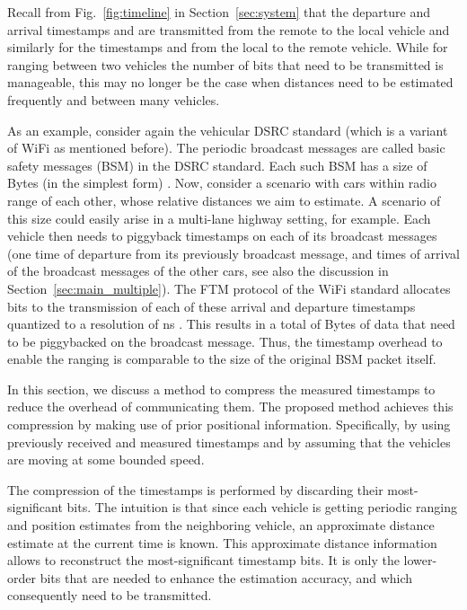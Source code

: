 \documentclass[12pt,journal,final,onecolumn]{IEEEtran}
\theoremstyle{definition}
\theoremstyle{myremark}
\begin{document}
Recall from Fig.~\ref{fig:timeline} in Section~\ref{sec:system} that the
departure and arrival timestamps  and  are transmitted from the
remote to the local vehicle and similarly for the timestamps  and
 from the local to the remote vehicle.  While for ranging between two
vehicles the number of bits that need to be transmitted is manageable, this may
no longer be the case when distances need to be estimated frequently and between
many vehicles. 

As an example, consider again the vehicular DSRC standard (which is a variant of
WiFi as mentioned before). The periodic broadcast messages are called basic
safety messages (BSM) in the DSRC standard. Each such BSM has a size of 
Bytes (in the simplest form) \cite{ansari2013}. Now, consider a scenario with
 cars within radio range of each other, whose relative distances we aim to
estimate. A scenario of this size could easily arise in a multi-lane highway
setting, for example. Each vehicle then needs to piggyback  timestamps on
each of its broadcast messages (one time of departure from its previously
broadcast message, and  times of arrival of the broadcast messages of the
other cars, see also the discussion in Section~\ref{sec:main_multiple}). The FTM
protocol of the WiFi standard allocates  bits to the transmission of each of
these arrival and departure timestamps quantized to a resolution of  ns
\cite{11mc}. This results in a total of  Bytes of data that need to be
piggybacked on the broadcast message.  Thus, the timestamp overhead to enable
the ranging is comparable to the size of the original BSM packet itself. 

In this section, we discuss a method to compress the measured timestamps to
reduce the overhead of communicating them. The proposed method achieves this
compression by making use of prior positional information. Specifically, by
using previously received and measured timestamps and by assuming that the
vehicles are moving at some bounded speed.

The compression of the timestamps is performed by discarding their
most-significant bits. The intuition is that since each vehicle is getting
periodic ranging and position estimates from the neighboring vehicle, an
approximate distance estimate at the current time is known. This approximate
distance information allows to reconstruct the most-significant timestamp bits.
It is only the lower-order bits that are needed to enhance the estimation
accuracy, and which consequently need to be transmitted. 
\end{document}
